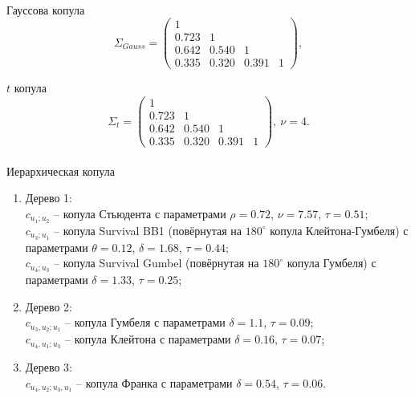 \documentclass[aspectratio=169]{beamer}
\begin{document}
\begin{frame}{\insertsection}
    \framesubtitle{\insertsubsection}
    \begin{block}{Гауссова копула}
    \begin{equation}
        \Sigma_{Gauss} = \left(
        \begin{array}{cccc}
            1 & & & \\
            0.723 & 1 & & \\
            0.642 & 0.540 & 1 & \\
            0.335 & 0.320 & 0.391 & 1
        \end{array} \right),
    \end{equation}
    \end{block}
    \begin{block}{$t$ копула}
    \begin{equation} \label{tcopfit}
        \Sigma_t = \left(
        \begin{array}{cccc}
            1 & & & \\
            0.723 & 1 & & \\
            0.642 & 0.540 & 1 & \\
            0.335 & 0.320 & 0.391 & 1
        \end{array} \right), \ \nu = 4.
    \end{equation}
    \end{block}
\end{frame}

\begin{frame}{\insertsection}
    \framesubtitle{\insertsubsection}
    \begin{block}{Иерархическая копула}
    \begin{enumerate}[(1)]
        \item Дерево 1:\\
        $c_{u_1;u_2}$ -- копула Стьюдента с параметрами $\rho=0.72$, $\nu=7.57$, $\tau=0.51$;\\
        $c_{u_3;u_1}$ -- копула Survival BB1 (повёрнутая на $180^{\circ}$ копула Клейтона-Гумбеля) с параметрами $\theta=0.12$, $\delta=1.68$, $\tau=0.44$;\\
        $c_{u_4;u_3}$ -- копула Survival Gumbel (повёрнутая на $180^{\circ}$ копула Гумбеля) с параметрами $\delta=1.33$, $\tau=0.25$;
        \item Дерево 2:\\
        $c_{u_3,u_2;u_1}$ -- копула Гумбеля с параметрами $\delta=1.1$, $\tau=0.09$;\\
        $c_{u_4,u_1;u_3}$ -- копула Клейтона с параметрами $\delta=0.16$, $\tau=0.07$;
        \item Дерево 3:\\
        $c_{u_4,u_2;u_3,u_1}$ -- копула Франка с параметрами $\delta=0.54$, $\tau=0.06$.
    \end{enumerate}
    \end{block}
\end{frame}
\end{document}
